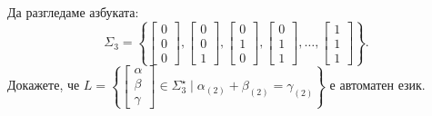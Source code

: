 \begin{problem}
  Да разгледаме азбуката:
  \[\Sigma_3 = \left\{\begin{bmatrix} 0\\0\\0\end{bmatrix},\begin{bmatrix} 0\\0\\1\end{bmatrix},\begin{bmatrix} 0\\1\\0\end{bmatrix},\begin{bmatrix} 0\\1\\1\end{bmatrix},\dots,\begin{bmatrix} 1\\1\\1\end{bmatrix}\right\}.\]
  Докажете, че 
  $L = \left\{\begin{bmatrix} \alpha\\\beta\\\gamma\end{bmatrix} \in \Sigma^\star_3 \mid \alpha_{(2)}+\beta_{(2)} = \gamma_{(2)}\right\}$
  е автоматен език.
\end{problem}
\ifhints
